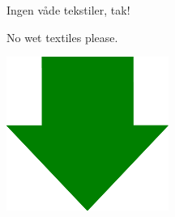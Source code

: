 \documentclass{article}
\begin{document}
\maketitle

\null

\begin{center}


\vspace{-0.8cm}

\huge

Ingen våde tekstiler, tak!

\english


\vspace{-1cm}

No wet textiles please.

\vspace{1.4cm}

\includegraphics[scale=0.8]{billeder/200pxDownArrowWikiCommons.png}

\vspace{-3cm}

\end{center}

\dansk

\underskriv
\end{document}
